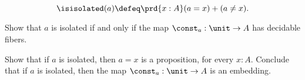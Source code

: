 \begin{exercises}
  \begin{equation*}
    \isisolated(a)\defeq\prd{x:A}(a=x)+(a\neq x).
  \end{equation*}
  \begin{subexenum}
  \item Show that $a$ is isolated if and only if the map $\const_a:\unit\to A$ has decidable fibers.
  \item Show that if $a$ is isolated, then $a=x$ is a proposition, for every $x:A$. Conclude that if $a$ is isolated, then the map $\const_a:\unit\to A$ is an embedding.
  \end{subexenum}
\end{exercises}

